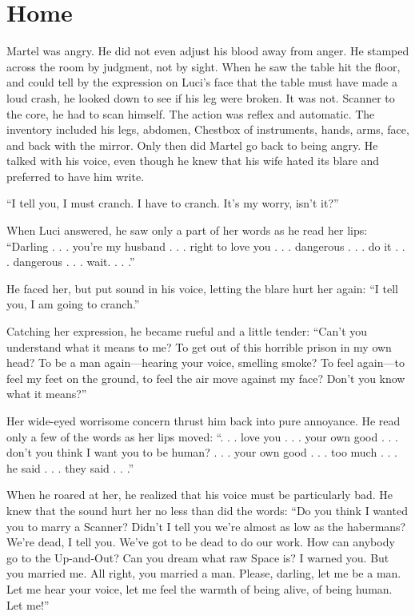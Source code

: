 
\section{Home}

Martel was angry. He did not even adjust his blood away from anger. He stamped across the room by judgment, not by sight. When he saw the table hit the floor, and could tell by the expression on Luci's face that the table must have made a loud crash, he looked down to see if his leg were broken. It was not. Scanner to the core, he had to scan himself. The action was reflex and automatic. The inventory included his legs, abdomen, Chestbox of instruments, hands, arms, face, and back with the mirror. Only then did Martel go back to being angry. He talked with his voice, even though he knew that his wife hated its blare and preferred to have him write.

``I tell you, I must cranch. I have to cranch. It's my worry, isn't it?''

When Luci answered, he saw only a part of her words as he read her lips: ``Darling . . . you're my husband . . . right to love you . . . dangerous . . . do it . . . dangerous . . . wait. . . .''

He faced her, but put sound in his voice, letting the blare hurt her again: ``I tell you, I am going to cranch.''

Catching her expression, he became rueful and a little tender: ``Can't you understand what it means to me? To get out of this horrible prison in my own head? To be a man again---hearing your voice, smelling smoke? To feel again---to feel my feet on the ground, to feel the air move against my face? Don't you know what it means?''

Her wide-eyed worrisome concern thrust him back into pure annoyance. He read only a few of the words as her lips moved: ``. . . love you . . . your own good . . . don't you think I want you to be human? . . . your own good . . . too much . . . he said . . . they said . . .''

When he roared at her, he realized that his voice must be particularly bad. He knew that the sound hurt her no less than did the words: ``Do you think I wanted you to marry a Scanner? Didn't I tell you we're almost as low as the habermans? We're dead, I tell you. We've got to be dead to do our work. How can anybody go to the Up-and-Out? Can you dream what raw Space is? I warned you. But you married me. All right, you married a man. Please, darling, let me be a man. Let me hear your voice, let me feel the warmth of being alive, of being human. Let me!''

